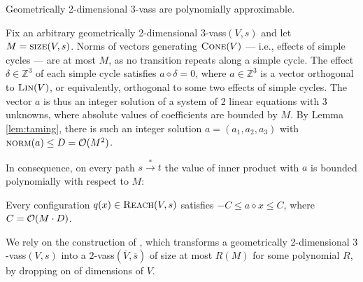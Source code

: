 \documentclass[a4paper, UKenglish, cleveref, autoref, thm-restate]{lipics-v2021}
\newcommand{\sandwich}{polynomially approximable\xspace}
\newcommand{\Z}{\mathbb{Z}}
\newcommand{\reach}{\textsc{Reach}}
\newcommand{\trans}[1]{\stackrel{#1}{\longrightarrow}}
\newcommand{\tran}{\trans{*}}
\newcommand{\norm}{\textsc{norm}}
\newcommand{\size}{\textsc{size}}
\newcommand{\Lin}[1]{\textsc{Lin}(#1)}
\newcommand{\OO}{{\cal O}}
\newcommand{\vass}{{\sc vass}\xspace}
\newcommand{\dvass}{\parvass 2}
\newcommand{\tvass}{\parvass 3}
\newcommand{\geomvass}{geometrically 2-dimensional \tvass}
\newcommand{\Geomvass}{Geometrically 2-dimensional \tvass}
\newcommand{\parvass}[1]{{$#1$-\vass}\xspace}
\newcommand{\cone}[1]{\textsc{Cone}(#1)}
\newcommand{\essdvass}[1]{\overline{#1}}
\newcommand{\innprod}[2]{#1 \diamond #2} \newcommand{\pair}[2]{#1_{#2}}
\begin{document}
\begin{lemma} \label{lem:geom-sandwich}
\Geomvass are \sandwich.
\end{lemma}
\begin{appendixproof}
Fix an arbitrary \geomvass $(V, s)$ and let $M = \size(V,s)$.
Norms of vectors generating $\cone V$ --- i.e., effects of simple cycles --- are at most $M$, 
as no transition repeats along a simple cycle.
The effect $\delta \in \Z^3$  of each simple cycle
satisfies $\innprod a \delta = 0$, where $a\in\Z^3$ is a vector orthogonal to $\Lin V$,
or equivalently, orthogonal to some two effects of simple cycles.
The vector $a$ is thus an integer solution of a system of 2 linear equations with 3 unknowns,
where absolute values of coefficients are bounded by $M$.
By Lemma \ref{lem:taming}, there is such an integer solution 
$a=(a_1, a_2, a_3)$ with $\norm(a)\leq D=\OO(M^2)$.


In consequence, on every path $s \tran t$ the value of inner product with $a$ is bounded polynomially
with respect to $M$:
\begin{claim} \label{claim:axx}
Every configuration $q(x)\in \reach(V,s)$  satisfies
$-C \leq \innprod a x \leq C$, where $C = \OO(M\cdot D)$. 
\end{claim}


We rely on the construction of \cite[Lemma 5.1]{Zhang-geom}, which transforms a 
\geomvass $(V,s )$ into a \dvass $(\essdvass V, \essdvass s)$ of size at most $R(M)$
for some polynomial $R$, by dropping on of dimensions of $V$.


\end{appendixproof}
\end{document}
